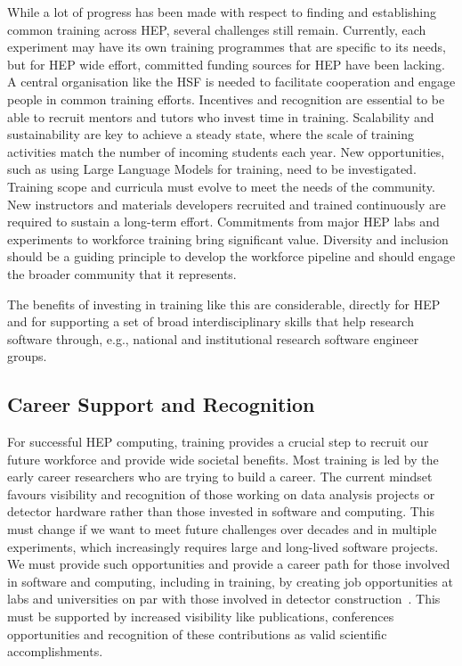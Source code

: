 \documentclass[10pt,a4paper]{article}
\begin{document}
While a lot of progress has been made with respect to finding and establishing
common training across HEP, several challenges still remain. Currently, each
experiment may have its own training programmes that are specific to its
needs, but for HEP wide effort, committed funding sources for HEP have been
lacking. A central organisation like the HSF is needed to facilitate cooperation
and engage people in common training efforts. Incentives and recognition are
essential to be able to recruit mentors and tutors who invest time in training.
Scalability and sustainability are key to achieve a steady state, where the
scale of training activities match the number of incoming students each year.
New opportunities, such as using Large Language Models for training, need to be investigated.
Training scope and curricula must evolve to meet the needs of the community.
New instructors and materials developers recruited and trained continuously are required to
sustain a long-term effort. 
Commitments from major HEP labs and experiments to workforce training bring significant value. 
Diversity
and inclusion should be a guiding principle to develop the workforce pipeline
and should engage the broader community that it represents.

The benefits of investing in training like this are considerable, directly for
HEP and for supporting a set of broad interdisciplinary skills that help
research software through, e.g., national and institutional research software
engineer groups.

\subsection{Career Support and
Recognition}\label{career-support-and-recognition}

For successful HEP computing, training provides a crucial step to recruit our
future workforce and provide wide societal benefits. Most training is led by the
early career researchers who are trying to build a career. The current mindset
favours visibility and recognition of those working on data analysis projects or
detector hardware rather than those invested in software and computing. This
must change if we want to meet future challenges over decades and in multiple
experiments, which increasingly requires large and long-lived software projects.
We must provide such opportunities and provide a career path for those
involved in software and computing, including in training, by creating job
opportunities at labs and universities on par with those involved in detector
construction~\cite{hsfcwp}. This must be supported by increased visibility like publications,
conferences opportunities and recognition of these contributions as valid
scientific accomplishments.
\end{document}
